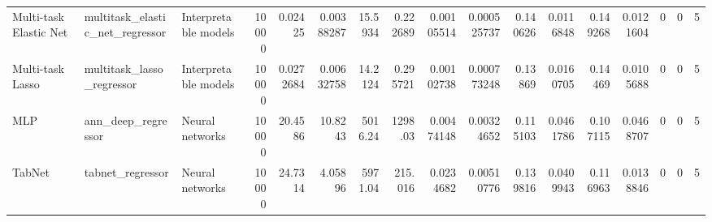 \begin{tabular}{lllrrrrrrrrrrrrrr}
Multi-task Elastic Net & multitask\_elastic\_net\_regressor & Interpretable models & 10000 & 0.02425 & 0.00388287 & 15.5934 & 0.222689 & 0.00105514 & 0.000525737 & 0.140626 & 0.0116848 & 0.149268 & 0.0121604 & 0 & 0 & 5 \\
Multi-task Lasso & multitask\_lasso\_regressor & Interpretable models & 10000 & 0.0272684 & 0.00632758 & 14.2124 & 0.295721 & 0.00102738 & 0.000773248 & 0.13869 & 0.0160705 & 0.14469 & 0.0105688 & 0 & 0 & 5 \\
MLP & ann\_deep\_regressor & Neural networks & 10000 & 20.4586 & 10.8243 & 5016.24 & 1298.03 & 0.00474148 & 0.00324652 & 0.115103 & 0.0461786 & 0.107115 & 0.0468707 & 0 & 0 & 5 \\
TabNet & tabnet\_regressor & Neural networks & 10000 & 24.7314 & 4.05896 & 5971.04 & 215.016 & 0.0234682 & 0.00510776 & 0.139816 & 0.0409943 & 0.116963 & 0.0138846 & 0 & 0 & 5 \\
\bottomrule
\end{tabular}
